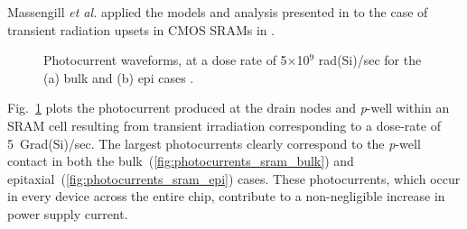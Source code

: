 Massengill \emph{et al.} applied the models and analysis presented in \cite{Long:1983fg} to the case of transient radiation upsets in CMOS SRAMs in \cite{Massengill:1984hn,Massengill:1985gd,Massengill:1986kp}. 
\begin{figure}[htbp]
    \begin{center}
    \end{center}
    \caption[Photocurrent waveforms, at a dose rate of 5$\times$10$^9$ rad(Si)/sec for the (a) bulk and (b) epi cases.]{Photocurrent waveforms, at a dose rate of 5$\times$10$^9$ rad(Si)/sec for the (a) bulk and (b) epi cases \cite{Massengill:1984hn}.}
    \label{fig:photocurrents_sram}
\end{figure}
Fig.~\ref{fig:photocurrents_sram} plots the photocurrent produced at the drain nodes and \emph{p}-well within an SRAM cell resulting from transient irradiation corresponding to a dose-rate of 5~Grad(Si)/sec.
The largest photocurrents clearly correspond to the \emph{p}-well contact in both the bulk~(\ref{fig:photocurrents_sram_bulk}) and epitaxial~(\ref{fig:photocurrents_sram_epi}) cases.
These photocurrents, which occur in every device across the entire chip, contribute to a non-negligible increase in power supply current.

